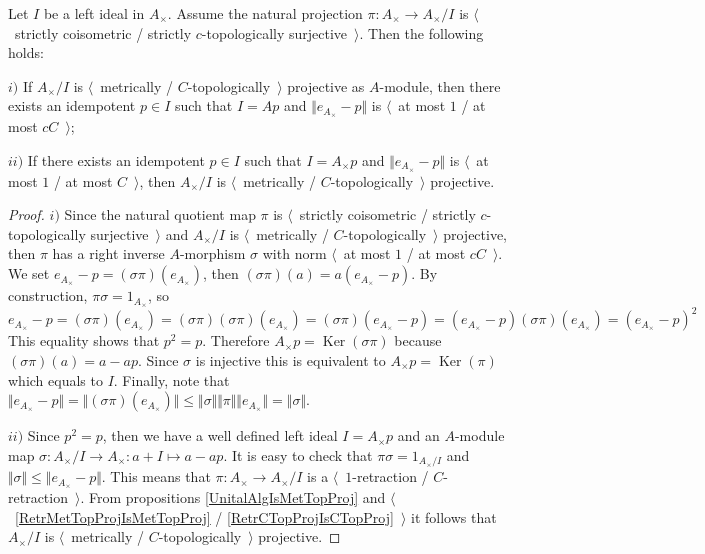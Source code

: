 \begin{proposition}\label{MetTopProjCycModCharac} Let $I$ be a left ideal in $A_\times $. Assume the natural projection $\pi:A_\times\to A_\times/I$ is $\langle$~strictly coisometric / strictly $c$-topologically surjective~$\rangle$. Then the following holds:

$i)$ If $A_\times /I$ is $\langle$~metrically / $C$-topologically~$\rangle$ projective as $A$-module, then there exists an idempotent $p\in I$ such that $I=Ap$ and $\Vert e_{A_\times}-p\Vert$ is $\langle$~at most $1$ / at most $cC$~$\rangle$;

$ii)$ If there exists an idempotent $p\in I$ such that $I=A_\times  p$ and $\Vert e_{A_\times }-p\Vert$ is $\langle$~at most $1$ / at most $C$~$\rangle$, then $A_\times/I$ is $\langle$~metrically / $C$-topologically~$\rangle$ projective.
\end{proposition}
\begin{proof} $i)$ Since the natural quotient map $\pi$ is $\langle$~strictly coisometric / strictly $c$-topologically surjective~$\rangle$ and $A_\times /I$ is $\langle$~metrically / $C$-topologically~$\rangle$ projective, then $\pi$ has a right inverse $A$-morphism $\sigma$ with norm $\langle$~at most $1$ / at most $cC$~$\rangle$. We set $e_{A_\times }-p=(\sigma\pi)(e_{A_\times })$, then $(\sigma\pi)(a)=a(e_{A_\times }-p)$. By construction, $\pi\sigma=1_{A_\times }$, so  
$$
e_{A_\times }-p=(\sigma\pi)(e_{A_\times })=(\sigma\pi)(\sigma\pi)(e_{A_\times })=(\sigma\pi)(e_{A_\times }-p)=(e_{A_\times }-p)(\sigma\pi)(e_{A_\times })=(e_{A_\times }-p)^2
$$
This equality shows that $p^2=p$. Therefore $A_\times p=\operatorname{Ker}(\sigma\pi)$ because $(\sigma\pi)(a)=a-ap$. Since $\sigma$ is injective this is equivalent to $A_\times p=\operatorname{Ker}(\pi)$ which equals to $I$. Finally, note that $\Vert e_{A_\times }-p\Vert=\Vert(\sigma\pi)(e_{A_\times})\Vert\leq\Vert\sigma\Vert\Vert\pi\Vert\Vert e_{A_\times }\Vert=\Vert\sigma\Vert$.

$ii)$ Since $p^2=p$, then we have a well defined left ideal $I=A_\times p$ and an $A$-module map $\sigma:A_\times /I\to A_\times:a+I\mapsto a-ap$. It is easy to check that  $\pi\sigma=1_{A_\times/I}$ and $\Vert\sigma\Vert\leq\Vert e_{A_\times }-p\Vert$. This means that $\pi:A_\times \to A_\times /I$ is a $\langle$~$1$-retraction / $C$-retraction~$\rangle$. From propositions \ref{UnitalAlgIsMetTopProj} and $\langle$~\ref{RetrMetTopProjIsMetTopProj} / \ref{RetrCTopProjIsCTopProj}~$\rangle$ it follows that $A_\times /I$ is $\langle$~metrically / $C$-topologically~$\rangle$ projective.
\end{proof} 

